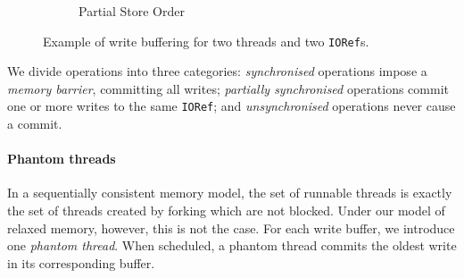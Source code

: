 \begin{figure}
\begin{subfigure}{0.3\textwidth}
    \caption{Partial Store Order}
  \end{subfigure}
  \caption{Example of write buffering for two threads and two \texttt{IORef}s.}
  \label{fig:wb}
\end{figure}

We divide operations into three categories: \emph{synchronised}
operations impose a \emph{memory barrier}, committing all writes;
\emph{partially synchronised} operations commit one or more writes to
the same \verb|IORef|; and \emph{unsynchronised} operations never cause
a commit.

\paragraph{Phantom threads}
In a sequentially consistent memory model, the set of runnable threads
is exactly the set of threads created by forking which are not
blocked.  Under our model of relaxed memory, however, this is not the
case.  For each write buffer, we introduce one \emph{phantom thread}.
When scheduled, a phantom thread commits the oldest write in its
corresponding buffer.

